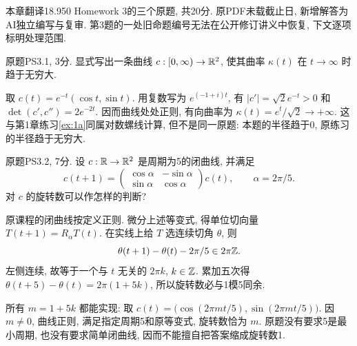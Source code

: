\par{}
本章翻译18.950 Homework 3的三个原题, 共20分. 原PDF未载截止日, 新增解答为AI独立编写与复审. 第3题的一处旧命题编号无法在公开修订讲义中恢复, 下文逐项标明处理范围.

\begin{exercise}\label{ps:3-1}
原题PS3.1, 3分. 显式写出一条曲线 $c:[0,\infty)\to\mathbb R^2$, 使其曲率 $\kappa(t)$ 在 $t\to\infty$ 时趋于无穷大.
\end{exercise}
\begin{solution}\label{pssol:3-1}
取 $c(t)=e^{-t}(\cos t,\sin t)$. 用复数写为 $e^{(-1+i)t}$, 有 $|c'|=\sqrt2e^{-t}>0$ 和 $\det(c',c'')=2e^{-2t}$. 因而曲线处处正则, 有向曲率为 $\kappa(t)=e^t/\sqrt2\to+\infty$. 这与第1章练习\ref{ex:1a}同属对数螺线计算, 但不是同一原题: 本题的半径趋于0, 原练习的半径趋于无穷大.
\end{solution}

\begin{exercise}\label{ps:3-2}
原题PS3.2, 7分. 设 $c:\mathbb R\to\mathbb R^2$ 是周期为5的闭曲线, 并满足
\[
 c(t+1)=\begin{pmatrix}\cos\alpha&-\sin\alpha\\ \sin\alpha&\cos\alpha\end{pmatrix}c(t),
 \qquad \alpha=2\pi/5.
\]
对 $c$ 的旋转数可以作怎样的判断?
\end{exercise}
\begin{solution}\label{pssol:3-2}
原课程的闭曲线按定义正则. 微分上述等变式, 得单位切向量 $T(t+1)=R_\alpha T(t)$. 在实线上给 $T$ 选连续切角 $\theta$, 则
\[
 \theta(t+1)-\theta(t)-2\pi/5\in2\pi\mathbb Z.
\]
左侧连续, 故等于一个与 $t$ 无关的 $2\pi k$, $k\in\mathbb Z$. 累加五次得 $\theta(t+5)-\theta(t)=2\pi(1+5k)$, 所以旋转数必与1模5同余.

所有 $m=1+5k$ 都能实现: 取 $c(t)=\bigl(\cos(2\pi mt/5),\sin(2\pi mt/5)\bigr)$. 因 $m\ne0$, 曲线正则, 满足指定周期5和原等变式, 旋转数恰为 $m$. 原题没有要求5是最小周期, 也没有要求简单闭曲线, 因而不能擅自把答案缩成旋转数1.
\end{solution}

